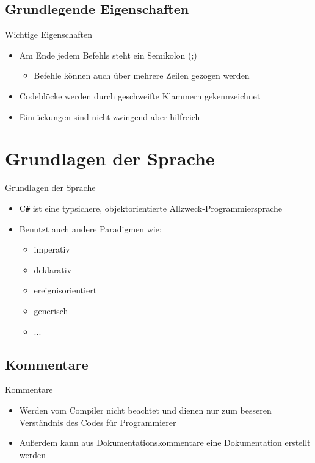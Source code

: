 \subsection{Grundlegende Eigenschaften}
\begin{frame}{Wichtige Eigenschaften}
	\begin{itemize}
		\item Am Ende jedem Befehls steht ein Semikolon (;)
		\begin{itemize}
			\item Befehle können auch über mehrere Zeilen gezogen werden
		\end{itemize}
		\item Codeblöcke werden durch geschweifte Klammern gekennzeichnet
		\item Einrückungen sind nicht zwingend aber hilfreich
	\end{itemize}
\end{frame}

\section{Grundlagen der Sprache}
\begin{frame}{Grundlagen der Sprache}
	\begin{itemize}
		\item C\texttt{\#} ist eine typsichere, objektorientierte Allzweck-Programmiersprache	
		\item Benutzt auch andere Paradigmen wie:
		\begin{itemize}
			\item imperativ
			\item deklarativ
			\item ereignisorientiert
			\item generisch
			\item ...
		\end{itemize}
	\end{itemize}	
\end{frame}

\subsection{Kommentare}
\begin{frame}{Kommentare}
	\begin{itemize}
		\item Werden vom Compiler nicht beachtet und dienen nur zum besseren Verständnis des Codes für Programmierer
		\item Außerdem kann aus Dokumentationskommentare eine Dokumentation erstellt werden
	\end{itemize}
	
\end{frame}

